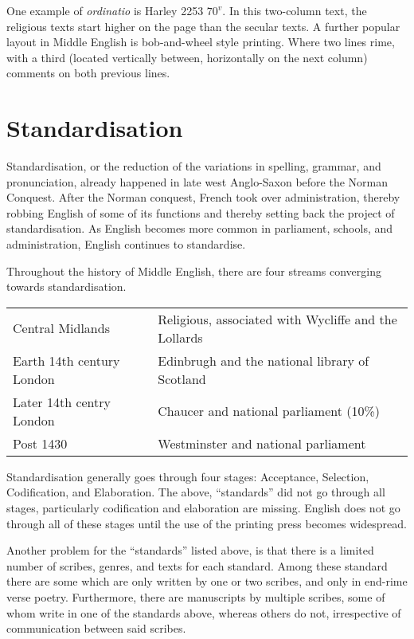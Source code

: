 \documentclass[12pt]{report}
\begin{document}
One example of \emph{ordinatio} is Harley 2253 $70^v$. In this two-column text,
the religious texts start higher on the page than the secular texts. A further
popular layout in Middle English is bob-and-wheel style printing. Where two
lines rime, with a third (located vertically between, horizontally on the next
column) comments on both previous lines.

\chapter{Standardisation}

Standardisation, or the reduction of the variations in spelling, grammar, and
pronunciation, already happened in late west Anglo-Saxon before the Norman
Conquest. After the Norman conquest, French took over administration, thereby
robbing English of some of its functions and thereby setting back the project of
standardisation. As English becomes more common in parliament, schools, and
administration, English continues to standardise.

Throughout the history of Middle English, there are four streams converging
towards standardisation.\\
\begin{tabular}{l|l}
Central Midlands & Religious, associated with Wycliffe and the Lollards\\
Earth 14th century London & Edinbrugh and the national library of Scotland\\
Later 14th centry London & Chaucer and national parliament (10\%)\\
Post 1430 & Westminster and national parliament
\end{tabular}

Standardisation generally goes through four stages: Acceptance, Selection,
Codification, and Elaboration. The above, ``standards'' did not go through all
stages, particularly codification and elaboration are missing. English does not
go through all of these stages until the use of the printing press becomes
widespread.

Another problem for the ``standards'' listed above, is that there is a limited
number of scribes, genres, and texts for each standard. Among these standard
there are some which are only written by one or two scribes, and only in
end-rime verse poetry. Furthermore, there are manuscripts by multiple scribes,
some of whom write in one of the standards above, whereas others do not,
irrespective of communication between said scribes.
\end{document}
